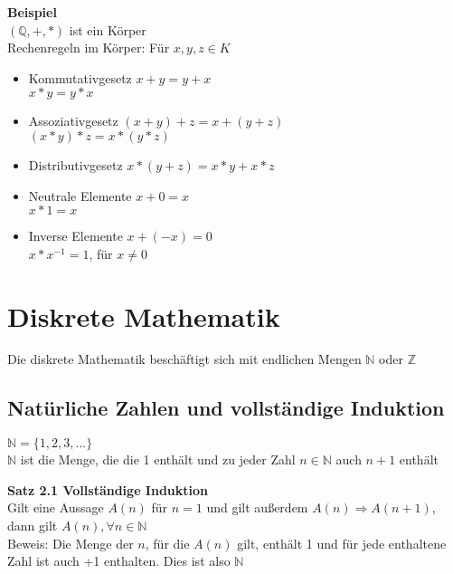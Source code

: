 \documentclass{article}
\begin{document}
	\begin{tcolorbox}[width=\linewidth, sharp corners=all, colback=white!95!black]
	\textbf{Beispiel}\\
	$(\mathbb{Q}, +, *)$ ist ein Körper\\
	Rechenregeln im Körper: Für $x,y,z \in K$
	\begin{itemize}
	\item Kommutativgesetz \tabto{4cm} $x+y = y+x$\\
	\tabto{4cm} $x*y = y*x$
	\item Assoziativgesetz \tabto{4cm} $(x+y)+z = x+(y+z)$\\
	\tabto{4cm} $(x*y)*z = x*(y*z)$
	\item Distributivgesetz \tabto{4cm} $x*(y+z) = x*y + x*z$
	\item Neutrale Elemente \tabto{4cm} $x+0=x$\\
	\tabto{4cm} $x*1=x$
	\item Inverse Elemente \tabto{4cm} $x+(-x) = 0$\\
	\tabto{4cm} $x*x^{-1} = 1$, für $x \neq 0$
	\end{itemize}
	\end{tcolorbox}
	
	\section{Diskrete Mathematik} 
	Die diskrete Mathematik beschäftigt sich mit endlichen Mengen $\mathbb{N}$ oder $\mathbb{Z}$
	\subsection{Natürliche Zahlen und vollständige Induktion}
	$\mathbb{N} = \{1, 2, 3, ...\}$\\
	$\mathbb{N}$ ist die Menge, die die 1 enthält und zu jeder Zahl $n \in \mathbb{N}$ auch $n+1$ enthält
	\begin{tcolorbox}[width=\linewidth, sharp corners=all, colback=white!95!black]
	\textbf{Satz 2.1 Vollständige Induktion}\\
	Gilt eine Aussage $A(n)$ für $n=1$ und gilt außerdem $A(n) \Rightarrow A(n+1)$, dann gilt $A(n), \forall n \in \mathbb{N}$\\
	Beweis: Die Menge der $n$, für die $A(n)$ gilt, enthält 1 und für jede enthaltene Zahl ist auch +1 enthalten. Dies ist also $\mathbb{N}$
	\end{tcolorbox}
	


	
	

	

	
\end{document}
